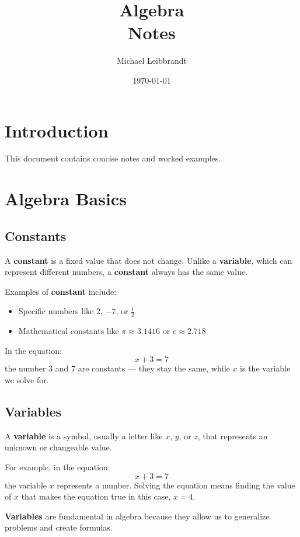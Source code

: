 \documentclass[11pt]{article}
\title{\Huge \textbf{Algebra}\\\large Notes}
\author{Michael Leibbrandt}
\date{\today}
\begin{document}
\maketitle
\tableofcontents
\newpage

\section{Introduction}

This document contains concise notes and worked examples.

\section{Algebra Basics}

\subsection{Constants}

A \textbf{constant} is a fixed value that does not change. Unlike a \textbf{variable}, which can represent different numbers, a \textbf{constant} always has the same value.

Examples of \textbf{constant} include:

\begin{itemize}
  \item Specific numbers like \( 2 \), \( -7 \), or \( \frac{1}{2} \)
  \item Mathematical constants like \( \pi \approx 3.1416 \) or \( e \approx 2.718 \)
\end{itemize}

In the equation:
\[
x + 3 = 7
\]
the number \( 3 \) and \( 7 \) are constants — they stay the same, while \( x \) is the variable we solve for.

\subsection{Variables}

A \textbf{variable} is a symbol, usually a letter like \( x \), \( y \), or \( z \), that represents an unknown or changeable value.

For example, in the equation:
\[
x + 3 = 7
\]
the variable \( x \) represents a number. Solving the equation means finding the value of \( x \) that makes the equation true in this case, \( x = 4 \).

\textbf{Variables} are fundamental in algebra because they allow us to generalize problems and create formulas.
\end{document}
